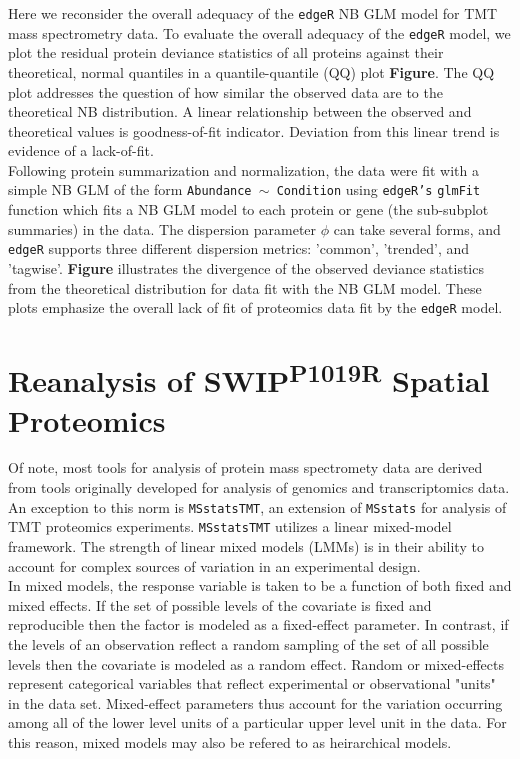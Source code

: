 \documentclass[11pt]{elife}\usepackage[]{graphicx}\usepackage[]{color}
\begin{document}
Here we reconsider the overall adequacy of the \texttt{edgeR} NB GLM model for 
TMT mass spectrometry data. 
To evaluate the overall adequacy of the \texttt{edgeR} model, we plot the 
residual protein deviance statistics of all proteins against their theoretical, 
normal quantiles in a quantile-quantile (QQ) plot \textbf{Figure}.
The QQ plot addresses the question of how similar the observed data are to the
theoretical NB distribution. A linear relationship between the
observed and theoretical values is goodness-of-fit indicator.
Deviation from this linear trend is evidence of a lack-of-fit.\\

Following protein summarization and normalization, the data were fit with 
a simple NB GLM of the form \texttt{Abundance $\sim$ Condition} using
\texttt{edgeR's} \texttt{glmFit} function which fits a NB GLM model to each
protein or gene (the sub-subplot summaries) in the data. The dispersion
parameter $\phi$ can take several forms, and \texttt{edgeR} supports three 
different dispersion metrics: 'common', 'trended', and 'tagwise'. 
\textbf{Figure} illustrates the divergence of the observed deviance statistics 
from the theoretical distribution for data fit with the NB GLM model. 
These plots emphasize the overall lack of fit of proteomics data 
fit by the \texttt{edgeR} model.\\ 


\section{Reanalysis of SWIP\textsuperscript{P1019R} Spatial Proteomics}

Of note, most tools for analysis of protein mass spectromety data are derived
from tools originally developed for analysis of genomics and transcriptomics
data. An exception to this norm is \texttt{MSstatsTMT}, an extension of 
\texttt{MSstats} for analysis of TMT proteomics experiments. \texttt{MSstatsTMT} 
utilizes a linear mixed-model framework. The strength of 
linear mixed models (LMMs) is in their ability to account for complex sources of 
variation in an experimental design.\\

In mixed models, the response variable is taken to be a function of both fixed
and mixed effects.
If the set of possible levels of the covariate is fixed and reproducible then
the factor is modeled as a fixed-effect parameter. In contrast, if the levels of
an observation reflect a random sampling of the set of all possible levels then
the covariate is modeled as a random effect.
Random or mixed-effects represent categorical variables
that reflect experimental or observational "units" in the data set. 
Mixed-effect parameters thus account for the variation occurring among all of the 
lower level units of a particular upper level unit in the data. For this reason,
mixed models may also be refered to as heirarchical models.\\
\end{document}
